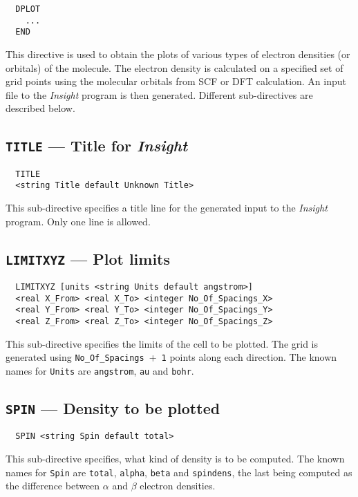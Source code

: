 \label{sec:dplot}
\begin{verbatim}
  DPLOT
    ...
  END
\end{verbatim}

This directive is used to obtain the plots of various types of electron
densities (or orbitals) of the molecule. The electron density is calculated
on a specified set of grid points using the molecular orbitals
from SCF or DFT calculation. An input file to the {\em Insight}
program is then generated. Different sub-directives are described below.

\subsection{{\tt TITLE} --- Title for {\em Insight}}

\begin{verbatim}
  TITLE
  <string Title default Unknown Title>
\end{verbatim}

This sub-directive specifies a title line for the generated
input to the {\em Insight} program. Only one line is allowed.

\subsection{{\tt LIMITXYZ} --- Plot limits}

\begin{verbatim}
  LIMITXYZ [units <string Units default angstrom>]
  <real X_From> <real X_To> <integer No_Of_Spacings_X>
  <real Y_From> <real Y_To> <integer No_Of_Spacings_Y>
  <real Z_From> <real Z_To> <integer No_Of_Spacings_Z>
\end{verbatim}

This sub-directive specifies the limits of the cell to be plotted.
The grid is generated using \verb+No_Of_Spacings+~+~\verb+1+ points
along each direction. The known names for \verb+Units+ are
\verb+angstrom+, \verb+au+ and \verb+bohr+.



\subsection{{\tt SPIN} --- Density to be plotted}

\begin{verbatim}
  SPIN <string Spin default total>
\end{verbatim}

This sub-directive specifies, what kind of density is to be computed. The 
known names for \verb+Spin+ are \verb+total+, \verb+alpha+, \verb+beta+
and \verb+spindens+, the last being computed as the difference between
$\alpha$ and $\beta$ electron densities.



